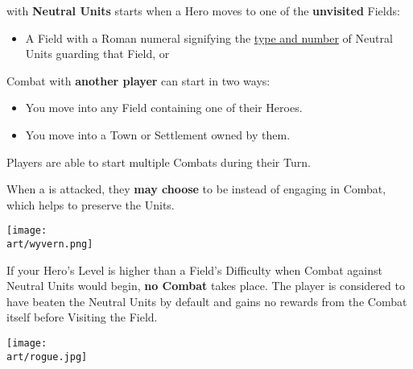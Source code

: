 
\begin{multicols*}{2}

 with \textbf{Neutral Units} starts when a Hero moves to one of the \textbf{unvisited} Fields:
\begin{itemize}
  \item A Field with a Roman numeral signifying the \hyperlink{Difficulty Table}{type and number} of Neutral Units guarding that Field, or
\end{itemize}

Combat with \textbf{another player} can start in two ways:
\begin{itemize}
  \item You move into any Field containing one of their Heroes.
  \item You move into a Town or Settlement owned by them.
\end{itemize}
Players are able to start multiple Combats during their Turn.

When a  is attacked, they \textbf{may choose} to be  instead of engaging in Combat, which helps to preserve the Units.

\begin{center}
  \texttt{[image: \\art/wyvern.png]}
\end{center}

If your Hero's Level is higher than a Field's Difficulty when Combat against Neutral Units would begin, \textbf{no Combat} takes place.
The player is considered to have beaten the Neutral Units by default and gains no rewards from the Combat itself before Visiting the Field.

\vspace*{\fill}
\columnbreak

\begin{center}
  \texttt{[image: \\art/rogue.jpg]}
\end{center}
\end{multicols*}

